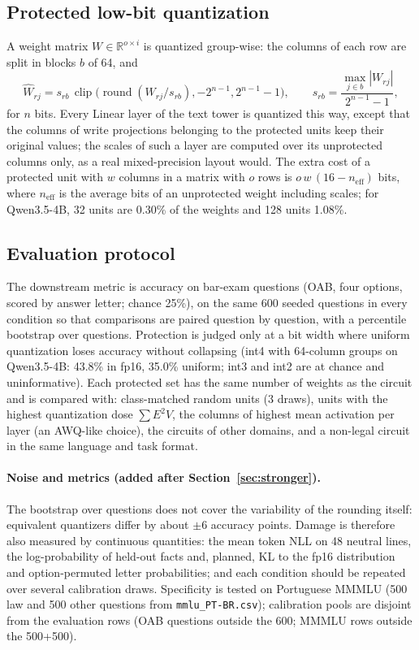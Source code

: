 \documentclass[11pt]{article}
\newcommand{\code}[1]{\texttt{#1}}
\begin{document}
\subsection{Protected low-bit quantization}
A weight matrix $W\in\mathbb{R}^{o\times i}$ is quantized group-wise: the columns of each row are split in blocks $b$ of 64, and
\begin{equation}
\hat W_{rj}=s_{rb}\,\operatorname{clip}\bigl(\operatorname{round}(W_{rj}/s_{rb}),-2^{n-1},2^{n-1}-1\bigr),\qquad s_{rb}=\frac{\max_{j\in b}|W_{rj}|}{2^{n-1}-1},
\end{equation}
for $n$ bits. Every Linear layer of the text tower is quantized this way, except that the columns of write projections belonging to the protected units keep their original values; the
scales of such a layer are computed over its unprotected columns only, as a real mixed-precision layout would. The extra cost of a protected unit with $w$ columns in a matrix with $o$ rows is
$o\,w\,(16-n_{\mathrm{eff}})$ bits, where $n_{\mathrm{eff}}$ is the average bits of an unprotected weight including scales; for Qwen3.5-4B, 32 units are 0.30\% of the weights and 128 units 1.08\%.

\subsection{Evaluation protocol}
The downstream metric is accuracy on bar-exam questions (OAB, four options, scored by answer letter; chance 25\%), on the same 600 seeded questions in every condition so that comparisons are
paired question by question, with a percentile bootstrap over questions. Protection is judged only at a bit width where uniform quantization loses accuracy without collapsing (int4 with 64-column groups on Qwen3.5-4B:
43.8\% in fp16, 35.0\% uniform; int3 and int2 are at chance and uninformative). Each protected set has the same number of weights as the circuit and is compared with: class-matched random units (3 draws), units with the highest
quantization dose $\sum E^2V$, the columns of highest mean activation per layer (an AWQ-like choice), the circuits of other domains, and a non-legal circuit in the same language and task format.

\paragraph{Noise and metrics (added after Section~\ref{sec:stronger}).} The bootstrap over questions does not cover the variability of the rounding itself: equivalent quantizers differ by about $\pm6$ accuracy points. Damage is therefore also measured by continuous quantities: the mean token NLL on
48 neutral lines, the log-probability of held-out facts and, planned, KL to the fp16 distribution and option-permuted letter probabilities; and each condition should be repeated over several calibration draws. Specificity is tested on Portuguese MMMLU (500 law and 500 other questions
from \code{mmlu\_PT-BR.csv}); calibration pools are disjoint from the evaluation rows (OAB questions outside the 600; MMMLU rows outside the 500+500).
\end{document}
